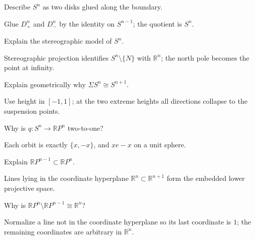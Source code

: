 \begin{problem}\label{prob:viii04-12}
Describe \(S^n\) as two disks glued along the boundary.
\end{problem}
\begin{solution}
Glue \(D^n_+\) and \(D^n_-\) by the identity on \(S^{n-1}\); the quotient is \(S^n\).
\end{solution}

\begin{problem}\label{prob:viii04-13}
Explain the stereographic model of \(S^n\).
\end{problem}
\begin{solution}
Stereographic projection identifies \(S^n\setminus\{N\}\) with \(\mathbb R^n\); the north pole becomes the point at infinity.
\end{solution}

\begin{problem}\label{prob:viii04-14}
Explain geometrically why \(\Sigma S^n\cong S^{n+1}\).
\end{problem}
\begin{solution}
Use height in \([-1,1]\); at the two extreme heights all directions collapse to the suspension points.
\end{solution}

\begin{problem}\label{prob:viii04-15}
Why is \(q:S^n\to\mathbb RP^n\) two-to-one?
\end{problem}
\begin{solution}
Each orbit is exactly \(\{x,-x\}\), and \(x
e -x\) on a unit sphere.
\end{solution}

\begin{problem}\label{prob:viii04-16}
Explain \(\mathbb RP^{n-1}\subset\mathbb RP^n\).
\end{problem}
\begin{solution}
Lines lying in the coordinate hyperplane \(\mathbb R^n\subset\mathbb R^{n+1}\) form the embedded lower projective space.
\end{solution}

\begin{problem}\label{prob:viii04-17}
Why is \(\mathbb RP^n\setminus\mathbb RP^{n-1}\cong\mathbb R^n\)?
\end{problem}
\begin{solution}
Normalize a line not in the coordinate hyperplane so its last coordinate is \(1\); the remaining coordinates are arbitrary in \(\mathbb R^n\).
\end{solution}

